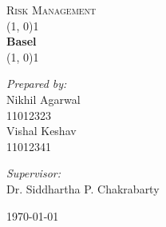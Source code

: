 \begin{titlepage}

\begin{center}

\textsc{\LARGE Risk Management}\\[2.5cm]

\linethickness{0.5mm}
\line(1, 0){1\linewidth} \\[0.4cm]
{\huge \bfseries Basel} \\[0.4cm]
\line(1, 0){1\linewidth} \\[2.5cm]

\begin{minipage}[t]{0.4\textwidth}
	\begin{flushleft} \large
	\emph{Prepared by:} \\[0.3cm]
	Nikhil Agarwal \\
	{\small 11012323} \\[0.2cm]
	Vishal Keshav \\
	{\small 11012341} \\[0.2cm]
	\end{flushleft}
\end{minipage}
\begin{minipage}[t]{0.4\textwidth}
	\begin{flushright} \large
	\emph{Supervisor:} \\[0.3cm]
	Dr. Siddhartha P. Chakrabarty 
	\end{flushright}
\end{minipage}

\vfill

{\large \today}

\end{center}

\end{titlepage}